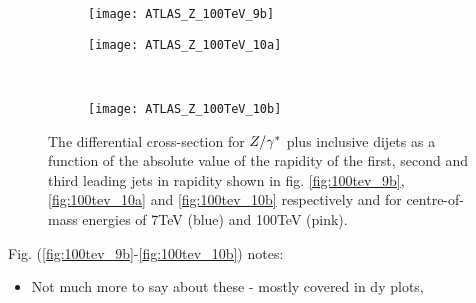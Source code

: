 	\begin{figure}[h]
		\centering
		\begin{subfigure}[b]{0.48\textwidth}
			\texttt{[image: ATLAS\_Z\_100TeV\_9b]}
			\caption{}
			\label{fig:100tev_9b}
		\end{subfigure}

		\begin{subfigure}[b]{0.48\textwidth}
			\texttt{[image: ATLAS\_Z\_100TeV\_10a]}
			\caption{}
			\label{fig:100tev_10a}
		\end{subfigure}
		~
		\begin{subfigure}[b]{0.48\textwidth}
			\texttt{[image: ATLAS\_Z\_100TeV\_10b]}
			\caption{}
			\label{fig:100tev_10b}
		\end{subfigure}
		\caption{The differential cross-section for $Z/\gamma^*$ plus inclusive dijets as a function of the absolute value of the rapidity
		         of the first, second and third leading jets in rapidity shown in fig. \eqref{fig:100tev_9b}, \eqref{fig:100tev_10a}
		         and \eqref{fig:100tev_10b} respectively and for centre-of-mass energies of 7TeV (blue) and 100TeV (pink).}
	\end{figure}

	Fig. (\eqref{fig:100tev_9b}-\eqref{fig:100tev_10b}) notes:

	\begin{itemize}
		\item Not much more to say about these - mostly covered in dy plots,
	\end{itemize}

